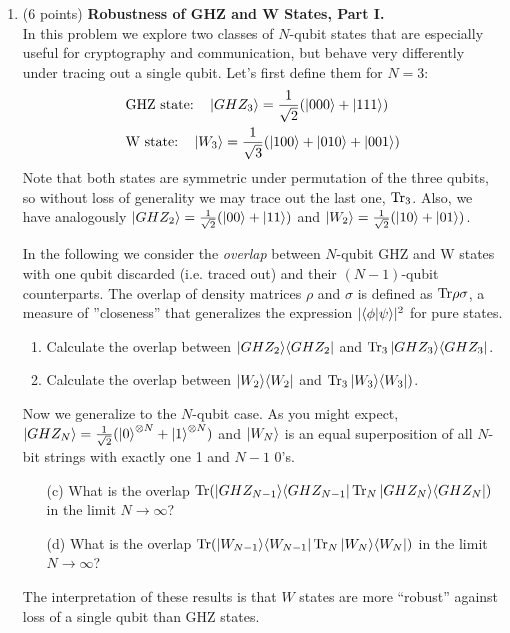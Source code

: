 \documentclass[12pt]{article}
\begin{document}
\begin{enumerate}
\item {(6 points)} {\bf Robustness of GHZ and W States, Part I.}\label{ex:robust-GHZ}\\
In this problem we explore two classes of $N$-qubit states that are especially useful for cryptography and communication, but behave very differently under tracing out a single qubit. Let's first define them for $N=3$:
\begin{align*}
& \text{GHZ state:} \quad \ket{GHZ_3} = \frac{1}{\sqrt{2}} (\ket{000}+\ket{111}) \\
& \text{W state:} \quad \ket{W_3} = \frac{1}{\sqrt{3}} (\ket{100}+\ket{010}+\ket{001})
\end{align*}
Note that both states are symmetric under permutation of the three qubits, so without loss of generality we may trace out the last one, $\mathrm{Tr}_3$. Also, we have analogously $\ket{GHZ_2}=\frac{1}{\sqrt{2}} (\ket{00}+\ket{11})$ and $\ket{W_2}=\frac{1}{\sqrt{2}} (\ket{10}+\ket{01})$.

In the following we consider the \textit{overlap} between $N$-qubit GHZ and W states with one qubit discarded (i.e. traced out) and their $(N-1)$-qubit counterparts. The overlap of density matrices $\rho$ and $\sigma$ is defined as $\mathrm{Tr} \rho\sigma$, a measure of ''closeness'' that generalizes the expression $|\langle \phi \vert \psi\rangle|^2$ for pure states.
\begin{enumerate}
\item Calculate the overlap between $\ket{GHZ_2}\!\bra{GHZ_2}$ and $\mathrm{Tr}_3\ket{GHZ_3}\!\bra{GHZ_3}$.
\item Calculate the overlap between  $\ket{W_2}\!\bra{W_2}$ and $\mathrm{Tr}_3\ket{W_3}\!\bra{W_3})$.
\end{enumerate}
Now we generalize to the $N$-qubit case. As you might expect, $\ket{GHZ_N}=\frac{1}{\sqrt{2}} (\ket{0}^{\otimes N}+\ket{1}^{\otimes N})$ and $\ket{W_N}$ is an equal superposition of all $N$-bit strings with exactly one 1 and $N-1$ 0's.
\begin{enumerate}
\item[(c)] What is the overlap $\mathrm{Tr}(\ket{GHZ_{N-1}}\!\bra{GHZ_{N-1}} \mathrm{Tr}_N\ket{GHZ_N}\!\bra{GHZ_N})$ in the limit $N \rightarrow \infty$?
\item[(d)] What is the overlap $\mathrm{Tr}(\ket{W_{N-1}}\!\bra{W_{N-1}} \mathrm{Tr}_N\ket{W_N}\!\bra{W_N})$ in the limit $N \rightarrow \infty$?
\end{enumerate}
The interpretation of these results is that $W$ states are more ``robust'' against loss of a single qubit than GHZ states.



\end{enumerate}
\end{document}
